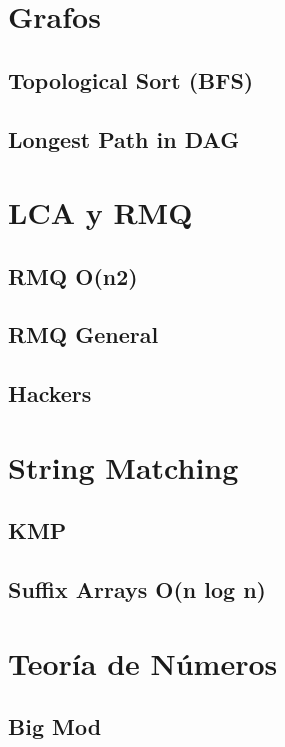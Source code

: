 \documentclass[10pt,letterpaper,twocolumn,twosided]{article}
\newcommand{\codigofuente}[1]{

\dotfill
}
\begin{document}
\section{Grafos}
\subsection{Topological Sort (BFS)}
\codigofuente{./graphs/topological_sort.cpp}

\subsection{Longest Path in DAG}
\codigofuente{./graphs/longest_path_in_dag.cpp}

\section {LCA y RMQ}
\subsection{RMQ O(n2)}
\codigofuente{./lca/lca.cpp}
\subsection{RMQ General}
\codigofuente{./lca/lubenica.cpp}
\subsection{Hackers}
\codigofuente{./lca/hackers.cpp}


\section{String Matching}
\subsection{KMP}
\codigofuente{./string_matching/kmp.cpp}
\subsection{Suffix Arrays O(n log n)}
\codigofuente{./string_matching/suffix_arrays.cpp}
\medskip

\section{Teoría de Números}
\subsection{Big Mod}
\codigofuente{./teoria_numeros/bigMod.cpp}
\end{document}
